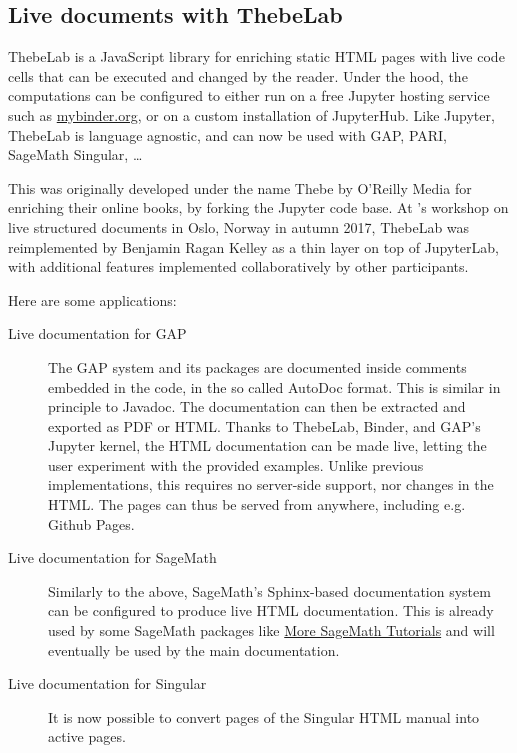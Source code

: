 \documentclass{deliverablereport}
\begin{document}
\subsection{Live documents with ThebeLab}

ThebeLab is a JavaScript library for enriching static HTML pages with live code cells
that can be executed and changed by the reader.
Under the hood, the computations can be configured to either run on a free Jupyter hosting service
such as \url{mybinder.org}, or on a custom installation of JupyterHub. Like Jupyter, ThebeLab
is language agnostic, and can now be used with GAP, PARI, SageMath Singular, \ldots

This was originally developed under the name Thebe by O'Reilly Media
for enriching their online books, by forking the Jupyter code base.
At \ODK's workshop on live structured documents in Oslo, Norway in autumn 2017, ThebeLab was
reimplemented by Benjamin Ragan Kelley as a thin layer on top of JupyterLab, with additional
features implemented collaboratively by other participants.

Here are some applications:
\begin{description}
\item[Live documentation for GAP] The GAP system and its packages are documented
inside comments embedded in the code, in the so called AutoDoc format.
This is similar in principle to Javadoc.
The documentation can then be extracted and exported as PDF or HTML.
Thanks to ThebeLab, Binder, and GAP's Jupyter kernel, the HTML documentation can be made live,
letting the user experiment with the provided examples.
Unlike previous implementations, this requires no server-side support, nor changes in the HTML.
The pages can thus be served from anywhere, including e.g. Github Pages.

\item[Live documentation for SageMath] Similarly to the above, SageMath's Sphinx-based documentation system
can be configured to produce live HTML documentation.
This is already used by some SageMath packages like
\href{http://more-sagemath-tutorials.readthedocs.io/}{More SageMath Tutorials}
and will eventually be used by the main \Sage documentation.

\item[Live documentation for Singular] It is now possible to convert pages of the Singular
HTML manual into active pages.

\end{description}
\end{document}
